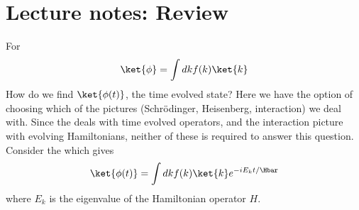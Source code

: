 %
%
\section{Lecture notes: Review}

For
\begin{equation}\label{eqn:lecture5BigReviewCh3Dynamical:20}
\ket{\phi} = \int dk f(k) \ket{k}
\end{equation}
%
How do we find \(\ket{\phi(t)}\), the time evolved state?  Here we have the option of choosing which of the pictures (Schr\"{o}dinger, Heisenberg, interaction) we deal with.  Since the  deals with time evolved operators, and the interaction picture with evolving Hamiltonians, neither of these is required to answer this question.  Consider the  which gives
%
\begin{equation}\label{eqn:lecture5BigReviewCh3Dynamical:40}
\ket{\phi(t)} = \int dk f(k) \ket{k} e^{-i E_k t/\Hbar}
\end{equation}
%
where \(E_k\) is the eigenvalue of the Hamiltonian operator \(H\).


